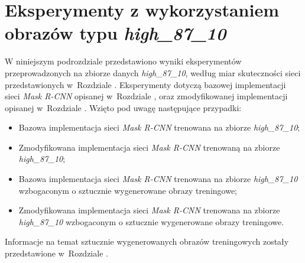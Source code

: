 \section{Eksperymenty z wykorzystaniem obrazów typu \textit{high\_87\_10}}
\label{sec:experymenty_high}
W niniejszym podrozdziale przedstawiono wyniki eksperymentów przeprowadzonych na zbiorze danych \textit{high\_87\_10}, według miar skuteczności sieci przedstawionych w~Rozdziale .
Eksperymenty dotyczą bazowej implementacji sieci \textit{Mask R-CNN} \cite{matterport-mask-rcnn} opisanej w~Rozdziale , oraz zmodyfikowanej implementacji opisanej w~Rozdziale .
 Wzięto pod uwagę następujące przypadki:

\begin{itemize}
 \item Bazowa implementacja sieci \textit{Mask R-CNN} trenowana na zbiorze \textit{high\_87\_10};
 \item Zmodyfikowana implementacja sieci \textit{Mask R-CNN} trenowaną na zbiorze \textit{high\_87\_10};
 \item Bazowa implementacja sieci \textit{Mask R-CNN} trenowana na zbiorze \textit{high\_87\_10} wzbogaconym o sztucznie wygenerowane obrazy treningowe;
 \item Zmodyfikowana implementacja sieci \textit{Mask R-CNN} trenowana na zbiorze \textit{high\_87\_10} wzbogaconym o sztucznie wygenerowane obrazy treningowe.
\end{itemize}

Informacje na temat sztucznie wygenerowanych obrazów treningowych zostały przedstawione w~Rozdziale .

